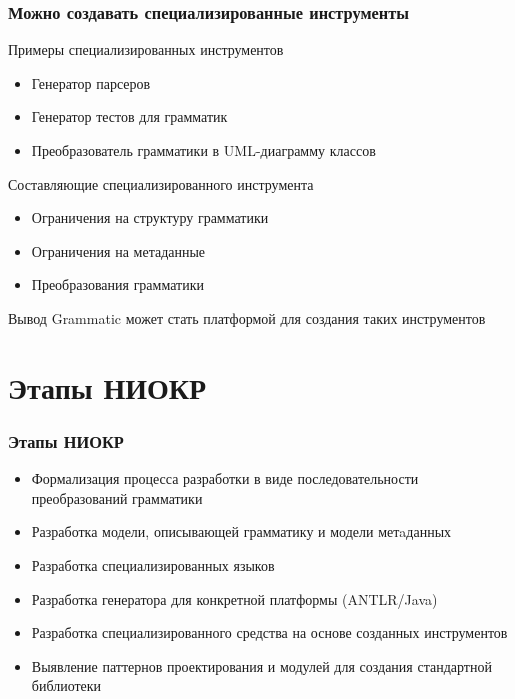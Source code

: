 \documentclass[paper=screen,10pt,unicode]{beamer}
\begin{document}
\begin{frame}
	\frametitle{Можно создавать специализированные инструменты}

	\begin{block}{Примеры специализированных инструментов}
		\begin{itemize}
			\item Генератор парсеров
			\item Генератор тестов для грамматик
			\item Преобразователь грамматики в UML-диаграмму классов
		\end{itemize}
	\end{block}
	\begin{block}{Составляющие специализированного инструмента}
		\begin{itemize}
			\item Ограничения на структуру грамматики
			\item Ограничения на метаданные
			\item Преобразования грамматики
		\end{itemize}
	\end{block}
	\begin{block}{Вывод}
		Grammatic может стать платформой для создания таких инструментов
	\end{block}
\end{frame}

\section{Этапы НИОКР}

\begin{frame}
	\frametitle{Этапы НИОКР}

	\begin{block}{}
		\begin{itemize}
			\item Формализация процесса разработки в виде последовательности преобразований грамматики
			\item Разработка модели, описывающей грамматику и модели метaданных
			\item Разработка специализированных языков
			\item Разработка генератора для конкретной платформы (ANTLR/Java)
			\item Разработка специализированного средства на основе созданных инструментов 
			\item Выявление паттернов проектирования и модулей для создания стандартной библиотеки 
		\end{itemize}
	\end{block}
\end{frame}
\end{document}
